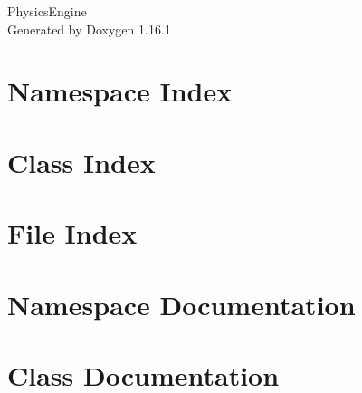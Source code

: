 \documentclass[twoside]{book}
\newcommand{\+}{\discretionary{\mbox{\scriptsize$\hookleftarrow$}}{}{}}
\newcommand{\clearemptydoublepage}{%
    \newpage{\pagestyle{empty}\cleardoublepage}%
  }
\begin{document}
  \raggedbottom
    \hypersetup{pageanchor=false,
                bookmarksnumbered=true,
                pdfencoding=unicode
               }
  \begin{titlepage}
  \vspace*{7cm}
  \begin{center}%
  {\Large Physics\+Engine}\\
  \vspace*{1cm}
  {\large Generated by Doxygen 1.16.1}\\
  \end{center}
  \end{titlepage}
  \clearemptydoublepage
  \tableofcontents
  \clearemptydoublepage
  \hypersetup{pageanchor=true}
\chapter{Namespace Index}

\chapter{Class Index}

\chapter{File Index}

\chapter{Namespace Documentation}

\chapter{Class Documentation}






















\end{document}
